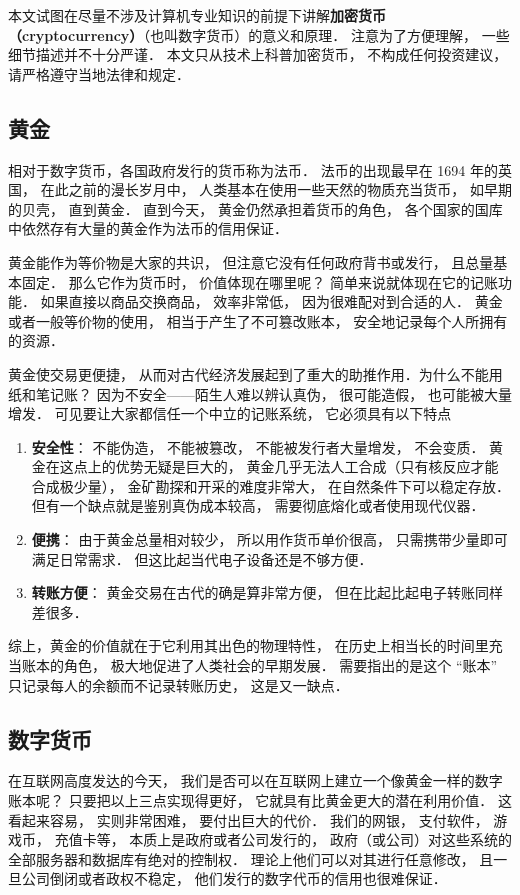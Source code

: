 
本文试图在尽量不涉及计算机专业知识的前提下讲解\textbf{加密货币（cryptocurrency）}（也叫数字货币）的意义和原理． 注意为了方便理解， 一些细节描述并不十分严谨． 本文只从技术上科普加密货币， 不构成任何投资建议， 请严格遵守当地法律和规定．

\subsection{黄金}
相对于数字货币，各国政府发行的货币称为法币． 法币的出现最早在 1694 年的英国， 在此之前的漫长岁月中， 人类基本在使用一些天然的物质充当货币， 如早期的贝壳， 直到黄金． 直到今天， 黄金仍然承担着货币的角色， 各个国家的国库中依然存有大量的黄金作为法币的信用保证．

黄金能作为等价物是大家的共识， 但注意它没有任何政府背书或发行， 且总量基本固定． 那么它作为货币时， 价值体现在哪里呢？ 简单来说就体现在它的记账功能． 如果直接以商品交换商品， 效率非常低， 因为很难配对到合适的人． 黄金或者一般等价物的使用， 相当于产生了不可篡改账本， 安全地记录每个人所拥有的资源．

黄金使交易更便捷， 从而对古代经济发展起到了重大的助推作用．为什么不能用纸和笔记账？ 因为不安全——陌生人难以辨认真伪， 很可能造假， 也可能被大量增发． 可见要让大家都信任一个中立的记账系统， 它必须具有以下特点
\begin{enumerate}
\item \textbf{安全性}： 不能伪造， 不能被篡改， 不能被发行者大量增发， 不会变质． 黄金在这点上的优势无疑是巨大的， 黄金几乎无法人工合成（只有核反应才能合成极少量）， 金矿勘探和开采的难度非常大， 在自然条件下可以稳定存放． 但有一个缺点就是鉴别真伪成本较高， 需要彻底熔化或者使用现代仪器．
\item \textbf{便携}： 由于黄金总量相对较少， 所以用作货币单价很高， 只需携带少量即可满足日常需求． 但这比起当代电子设备还是不够方便．
\item \textbf{转账方便}： 黄金交易在古代的确是算非常方便， 但在比起比起电子转账同样差很多．
\end{enumerate}

综上，黄金的价值就在于它利用其出色的物理特性， 在历史上相当长的时间里充当账本的角色， 极大地促进了人类社会的早期发展． 需要指出的是这个 “账本” 只记录每人的余额而不记录转账历史， 这是又一缺点．

\subsection{数字货币}
在互联网高度发达的今天， 我们是否可以在互联网上建立一个像黄金一样的数字账本呢？ 只要把以上三点实现得更好， 它就具有比黄金更大的潜在利用价值． 这看起来容易， 实则非常困难， 要付出巨大的代价． 我们的网银， 支付软件， 游戏币， 充值卡等， 本质上是政府或者公司发行的， 政府（或公司）对这些系统的全部服务器和数据库有绝对的控制权． 理论上他们可以对其进行任意修改， 且一旦公司倒闭或者政权不稳定， 他们发行的数字代币的信用也很难保证．

